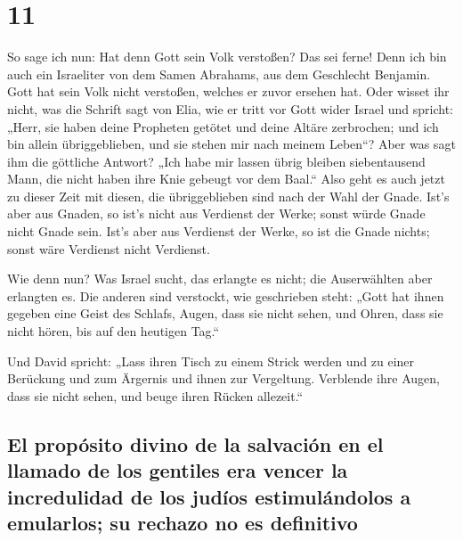 \hypertarget{section-10}{%
\section{11}\label{section-10}}

 So sage ich nun: Hat denn Gott sein Volk verstoßen? Das
sei ferne! Denn ich bin auch ein Israeliter von dem Samen Abrahams, aus
dem Geschlecht Benjamin.  Gott hat sein Volk nicht
verstoßen, welches er zuvor ersehen hat. Oder wisset ihr nicht, was die
Schrift sagt von Elia, wie er tritt vor Gott wider Israel und spricht:
 „Herr, sie haben deine Propheten getötet und deine Altäre
zerbrochen; und ich bin allein übriggeblieben, und sie stehen mir nach
meinem Leben``?  Aber was sagt ihm die göttliche Antwort?
„Ich habe mir lassen übrig bleiben siebentausend Mann, die nicht haben
ihre Knie gebeugt vor dem Baal.``  Also geht es auch jetzt
zu dieser Zeit mit diesen, die übriggeblieben sind nach der Wahl der
Gnade.  Ist's aber aus Gnaden, so ist's nicht aus
Verdienst der Werke; sonst würde Gnade nicht Gnade sein. Ist's aber aus
Verdienst der Werke, so ist die Gnade nichts; sonst wäre Verdienst nicht
Verdienst.

 Wie denn nun? Was Israel sucht, das erlangte es nicht;
die Auserwählten aber erlangten es. Die anderen sind verstockt,
 wie geschrieben steht: „Gott hat ihnen gegeben eine Geist
des Schlafs, Augen, dass sie nicht sehen, und Ohren, dass sie nicht
hören, bis auf den heutigen Tag.``

 Und David spricht: „Lass ihren Tisch zu einem Strick
werden und zu einer Berückung und zum Ärgernis und ihnen zur Vergeltung.
 Verblende ihre Augen, dass sie nicht sehen, und beuge
ihren Rücken allezeit.``

\hypertarget{el-propuxf3sito-divino-de-la-salvaciuxf3n-en-el-llamado-de-los-gentiles-era-vencer-la-incredulidad-de-los-juduxedos-estimuluxe1ndolos-a-emularlos-su-rechazo-no-es-definitivo}{%
\subsection{El propósito divino de la salvación en el llamado de los
gentiles era vencer la incredulidad de los judíos estimulándolos a
emularlos; su rechazo no es
definitivo}\label{el-propuxf3sito-divino-de-la-salvaciuxf3n-en-el-llamado-de-los-gentiles-era-vencer-la-incredulidad-de-los-juduxedos-estimuluxe1ndolos-a-emularlos-su-rechazo-no-es-definitivo}}

